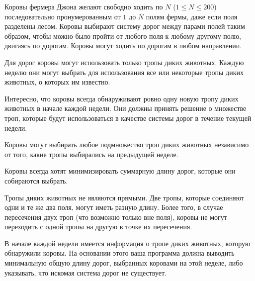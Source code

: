 Коровы фермера Джона желают свободно ходить по $N$ ($1 \le N \le 200$) последовательно 
пронумерованным от $1$ до $N$ полям фермы, даже если поля разделены лесом. Коровы
выбирают систему дорог между парами полей таким образом, чтобы можно было пройти
от любого поля к любому другому полю, двигаясь по дорогам. Коровы могут
ходить по дорогам в любом направлении. 

Для дорог коровы могут использовать только тропы диких животных. Каждую неделю
они могут выбрать для использования все или некоторые тропы диких животных, о
которых им известно. 

Интересно, что коровы всегда обнаруживают ровно одну новую тропу диких
животных в начале каждой недели. Они должны принять решение о множестве троп, 
которые будут использоваться в качестве системы дорог в течение текущей недели. 

Коровы могут выбирать любое подмножество троп диких животных независимо от
того, какие тропы выбирались на предыдущей неделе. 

Коровы всегда хотят минимизировать суммарную длину дорог, которые они
собираются выбрать. 

Тропы диких животных не являются прямыми. Две тропы, которые соединяют одни и
те же два поля, могут иметь разную длину. Более того, в случае пересечения двух троп
(что возможно только вне поля), коровы не могут переходить с одной тропы на другую
в точке их пересечения. 

В начале каждой недели имеется информация о тропе диких животных, которую
обнаружили коровы. На основании этого ваша программа должна выводить
минимальную общую длину дорог, выбранных коровами на этой неделе, либо
указывать, что искомая система дорог не существует. 
